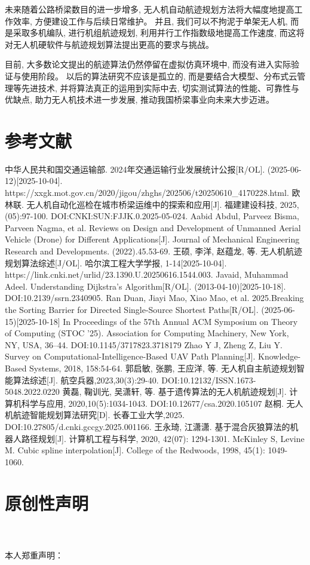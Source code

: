 \documentclass[12pt,a4paper,oneside,UTF8]{ctexart}
\begin{document}
未来随着公路桥梁数目的进一步增多,
无人机自动航迹规划方法将大幅度地提高工作效率,
方便建设工作与后续日常维护。
并且,
我们可以不拘泥于单架无人机,
而是采取多机编队,
进行机组航迹规划,
利用并行工作指数级地提高工作速度,
而这将对无人机硬软件与航迹规划算法提出更高的要求与挑战。

目前,
大多数论文提出的航迹算法仍然停留在虚拟仿真环境中,
而没有进入实际验证与使用阶段。
以后的算法研究不应该是孤立的,
而是要结合大模型、分布式云管理等先进技术,
并将算法真正的运用到实际中去,
切实测试算法的性能、可靠性与优缺点,
助力无人机技术进一步发展,
推动我国桥梁事业向未来大步迈进。
\newpage\section{参考文献}\begin{thebibliography}{20}
中华人民共和国交通运输部. 2024年交通运输行业发展统计公报[R/OL]. (2025-06-12)[2025-10-04]. https://xxgk.mot.gov.cn/2020/jigou/zhghs/202506/t20250610\_4170228.html.
欧林联. 无人机自动化巡检在城市桥梁运维中的探索和应用[J]. 福建建设科技, 2025,(05):97-100. DOI:CNKI:SUN:FJJK.0.2025-05-024.
Aabid Abdul, Parveez Bisma, Parveen Nagma, et al. Reviews on Design and Development of Unmanned Aerial Vehicle (Drone) for Different Applications[J]. Journal of Mechanical Engineering Research and Developments. (2022).45.53-69.
王硕, 李洋, 赵蕴龙, 等. 无人机航迹规划算法综述[J/OL]. 哈尔滨工程大学学报, 1-14[2025-10-04]. https://link.cnki.net/urlid/23.1390.U.20250616.1544.003.
Javaid, Muhammad Adeel. Understanding Dijkstra's Algorithm[R/OL]. (2013-04-10)[2025-10-18]. DOI:10.2139/ssrn.2340905.
Ran Duan, Jiayi Mao, Xiao Mao, et al. 2025.Breaking the Sorting Barrier for Directed Single-Source Shortest Paths[R/OL]. (2025-06-15)[2025-10-18] In Proceedings of the 57th Annual ACM Symposium on Theory of Computing (STOC '25). Association for Computing Machinery, New York, NY, USA, 36–44. DOI:10.1145/3717823.3718179
Zhao Y J, Zheng Z, Liu Y. Survey on Computational-Intelligence-Based UAV Path Planning[J]. Knowledge-Based Systems, 2018, 158:54-64.
郭启敏, 张鹏, 王应洋, 等. 无人机自主航迹规划智能算法综述[J]. 航空兵器,2023,30(3):29-40. DOI:10.12132/ISSN.1673-5048.2022.0220 
黄磊, 鞠训光, 吴潇轩, 等. 基于遗传算法的无人机航迹规划[J]. 计算机科学与应用, 2020,10(5):1034-1043. DOI:10.12677/csa.2020.105107
赵桐. 无人机航迹智能规划算法研究[D]. 长春工业大学,2025. DOI:10.27805/d.cnki.gccgy.2025.001166.
王永琦, 江潇潇. 基于混合灰狼算法的机器人路径规划[J]. 计算机工程与科学, 2020, 42(07): 1294-1301.
McKinley S, Levine M. Cubic spline interpolation[J]. College of the Redwoods, 1998, 45(1): 1049-1060.
\end{thebibliography}
\newpage\section{原创性声明}
~\\
~\\
本人郑重声明：
\end{document}
